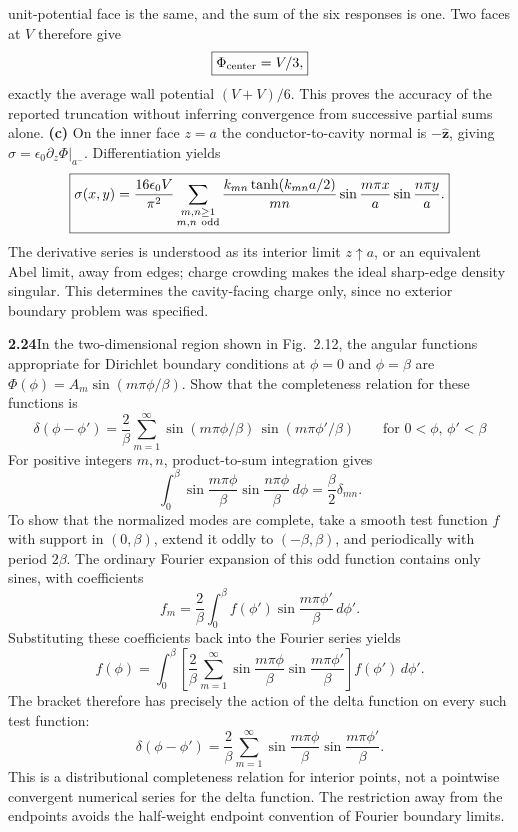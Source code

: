 unit-potential face is the same, and the sum of the six responses
is one. Two faces at $V$ therefore give
\[
\boxed{\Phi_{\rm center}=V/3,}
\]
exactly the average wall potential $(V+V)/6$. This proves the
accuracy of the reported truncation without inferring convergence
from successive partial sums alone.
\textbf{(c)} On the inner face $z=a$ the conductor-to-cavity normal
is $-\widehat{\mathbf z}$, giving
$\sigma=\epsilon _0\partial_z\Phi|_{a^-}$. Differentiation yields
\[
\boxed{\sigma(x,y)=\frac{16\epsilon _0V}{\pi^2}
 \sum_{\substack{m,n\geq1\\m,n\ {\rm odd}}}
 \frac{k_{mn}\tanh(k_{mn}a/2)}{mn}
       \sin\frac{m\pi x}a\sin\frac{n\pi y}a.}
\]
The derivative series is understood as its interior limit
$z\uparrow a$, or an equivalent Abel limit, away from edges; charge
crowding makes the ideal sharp-edge density singular. This determines
the cavity-facing charge only, since no exterior boundary problem
was specified.

\par\bigskip
\noindent\textbf{2.24}\quad In the two-dimensional region shown in Fig.~2.12, the angular functions appropriate for Dirichlet boundary conditions at $\phi=0$ and $\phi=\beta$ are $\Phi(\phi)=A_{m}\sin(m\pi\phi/\beta)$. Show that the completeness relation for these functions is
\[
\delta(\phi-\phi')=\frac{2}{\beta}\sum_{m=1}^{\infty}\sin(m\pi\phi/\beta)\,\sin(m\pi\phi'/\beta)\qquad\text{for }0<\phi,\,\phi'<\beta
\]
\solution
For positive integers $m,n$, product-to-sum integration gives
\[
\int_0^\beta\sin\frac{m\pi\phi}\beta\sin\frac{n\pi\phi}\beta\,d\phi
=\frac\beta2\delta_{mn}.
\]
To show that the normalized modes are complete, take a smooth test
function $f$ with support in $(0,\beta)$, extend it oddly to
$(-\beta,\beta)$, and periodically with period $2\beta$.
The ordinary Fourier expansion of this odd function contains only
sines, with coefficients
\[
f_m=\frac2\beta\int_0^\beta f(\phi')
                    \sin\frac{m\pi\phi'}\beta\,d\phi'.
\]
Substituting these coefficients back into the Fourier series yields
\[
f(\phi)=\int_0^\beta\left[\frac2\beta\sum_{m=1}^\infty
 \sin\frac{m\pi\phi}\beta\sin\frac{m\pi\phi'}\beta\right]
 f(\phi')\,d\phi'.
\]
The bracket therefore has precisely the action of the delta
function on every such test function:
\[
\boxed{\delta(\phi-\phi')=\frac2\beta\sum_{m=1}^\infty
 \sin\frac{m\pi\phi}\beta\sin\frac{m\pi\phi'}\beta.}
\]
This is a distributional completeness relation for interior points,
not a pointwise convergent numerical series for the delta function.
The restriction away from the endpoints avoids the half-weight
endpoint convention of Fourier boundary limits.

